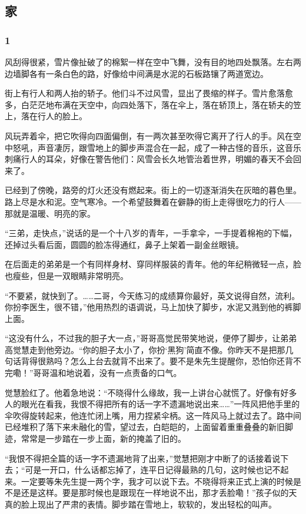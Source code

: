 \subsection{家}

\subsubsection*{1}

\par 风刮得很紧，雪片像扯破了的棉絮一样在空中飞舞，没有目的地四处飘落。左右两边墙脚各有一条白色的路，好像给中间满是水泥的石板路镶了两道宽边。
\par 街上有行人和两人抬的轿子。他们斗不过风雪，显出了畏缩的样子。雪片愈落愈多，白茫茫地布满在天空中，向四处落下，落在伞上，落在轿顶上，落在轿夫的笠上，落在行人的脸上。
\par 风玩弄着伞，把它吹得向四面偏倒，有一两次甚至吹得它离开了行人的手。风在空中怒吼，声音凄厉，跟雪地上的脚步声混合在一起，成了一种古怪的音乐，这音乐刺痛行人的耳朵，好像在警告他们：风雪会长久地管治着世界，明媚的春天不会回来了。
\par 已经到了傍晚，路旁的灯火还没有燃起来。街上的一切逐渐消失在灰暗的暮色里。路上尽是水和泥。空气寒冷。一个希望鼓舞着在僻静的街上走得很吃力的行人——那就是温暖、明亮的家。
\par “三弟，走快点，”说话的是一个十八岁的青年，一手拿伞，一手提着棉袍的下幅，还掉过头看后面，圆圆的脸冻得通红，鼻子上架着一副金丝眼镜。
\par 在后面走的弟弟是一个有同样身材、穿同样服装的青年。他的年纪稍微轻一点，脸也瘦些，但是一双眼睛非常明亮。
\par “不要紧，就快到了。……二哥，今天练习的成绩算你最好，英文说得自然，流利。你扮李医生，很不错，”他用热烈的语调说，马上加快了脚步，水泥又溅到他的裤脚上面。
\par “这没有什么，不过我的胆子大一点，”哥哥高觉民带笑地说，便停了脚步，让弟弟高觉慧走到他旁边。“你的胆子太小了，你扮‘黑狗’简直不像。你昨天不是把那几句话背得很熟吗？怎么上台去就背不出来了。要不是朱先生提醒你，恐怕你还背不完嘞！”哥哥温和地说着，没有一点责备的口气。
\par 觉慧脸红了。他着急地说：“不晓得什么缘故，我一上讲台心就慌了。好像有好多人的眼光在看我，我恨不得把所有的话一字不遗漏地说出来……”一阵风把他手里的伞吹得旋转起来，他连忙闭上嘴，用力捏紧伞柄。这一阵风马上就过去了。路中间已经堆积了落下来未融化的雪，望过去，白皑皑的，上面留着重重叠叠的新旧脚迹，常常是一步踏在一步上面，新的掩盖了旧的。
\par “我恨不得把全篇的话一字不遗漏地背了出来，”觉慧把刚才中断了的话接着说下去；“可是一开口，什么话都忘掉了，连平日记得最熟的几句，这时候也记不起来。一定要等朱先生提一两个字，我才可以说下去。不晓得将来正式上演的时候是不是还是这样。要是那时候也是跟现在一样地说不出，那才丢脸嘞！”孩子似的天真的脸上现出了严肃的表情。脚步踏在雪地上，软软的，发出轻松的叫声。
